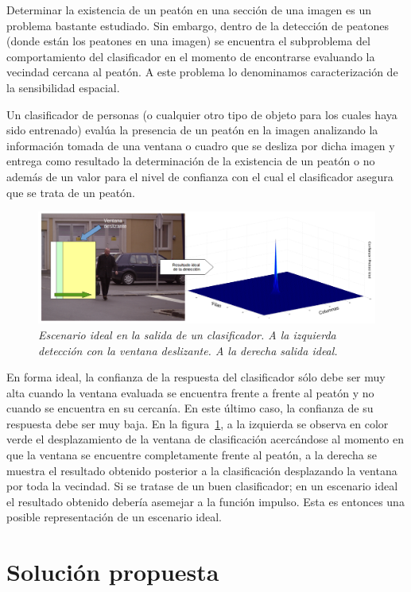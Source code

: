 Determinar la existencia de un peatón en una sección de una imagen es un problema bastante estudiado. Sin embargo, dentro de la detección de peatones (donde están los peatones en una imagen) se encuentra el subproblema del comportamiento del clasificador en el momento de encontrarse evaluando la vecindad cercana al peatón. A este problema lo denominamos caracterización de la sensibilidad espacial.

Un clasificador de personas (o cualquier otro tipo de objeto para los cuales haya sido entrenado) evalúa la presencia de un peatón en la imagen analizando la información tomada de una ventana o cuadro que se desliza por dicha imagen y entrega como resultado la determinación de la existencia de un peatón o no además de un valor para el nivel de confianza con el cual el clasificador asegura que se trata de un peatón.

\begin{figure}[htc]
  \centering
  \includegraphics[scale=.3]{images/ejloesp}
  \caption{\em Escenario ideal en la salida de un clasificador. A la izquierda detección con la ventana deslizante. A la derecha salida ideal.} 
  \label{fig:ejloesp}
\end{figure}


En forma ideal, la confianza de la respuesta del clasificador sólo debe ser muy alta cuando la ventana evaluada se encuentra frente a frente al peatón y no cuando se encuentra en su cercanía. En este último caso, la confianza de su respuesta debe ser muy baja. En la figura~\ref{fig:ejloesp}, a la izquierda se observa en color verde el desplazamiento de la ventana de clasificación acercándose al momento en que la ventana se encuentre completamente frente al peatón, a la derecha se muestra el resultado obtenido posterior a la clasificación desplazando la ventana por toda la vecindad. Si se tratase de un buen clasificador; en un escenario ideal el resultado obtenido debería asemejar a la función impulso. Esta es entonces una posible representación de un escenario ideal.


\section{Soluci\'on propuesta}
\label{intro:solucion}


